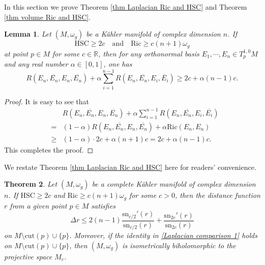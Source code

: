 \documentclass[12pt,reqno]{amsart}
\theoremstyle{plain}
\newtheorem{thm}{Theorem}[section]
\newtheorem{lemma}[thm]{Lemma}
\theoremstyle{definition}
\newcommand{\btheorem}{\begin{thm}}
\newcommand{\etheorem}{\end{thm}}
\newcommand{\bproof}{\begin{proof}}
\newcommand{\eproof}{\end{proof}}
\newcommand{\elemma}{\end{lemma}}
\newcommand{\blemma}{\begin{lemma}}
\renewcommand{\bar}{\overline}
\newcommand{\beq}{\begin{equation}}
\newcommand{\eeq}{\end{equation}}
\newcommand{\ee}{\end{eqnarray*}}
\newcommand{\be}{\begin{eqnarray*}}
\newcommand{\qtq}[1]{\quad\mbox{#1}\quad}
\renewcommand{\>}{\rightarrow}
\newcommand{\R}{{\mathbb R}}
\numberwithin{equation}{section} %
\newcommand{\om}{\omega}
\renewcommand{\leq}{\leqslant}
\renewcommand{\geq}{\geqslant}
\begin{document}
In this section we prove Theorem \ref{thm Laplacian Ric and HSC} and Theorem \ref{thm volume Ric and HSC}.

\blemma\label{keylinear2} Let $(M,\omega_g)$ be a K\"ahler manifold of complex dimension $n$.  If $$\mathrm{HSC}\geq 2c \qtq{and} \mathrm{Ric}\geq c(n+1)\om_g$$ at  point $p\in M$ for some $c\in \R$, then for any orthonormal basis $E_1,\cdots,E_{n}\in T^{1,0}_pM$ and any real number $\alpha\in [0,1]$, one has
\beq
R\left(E_n,\bar{E_n},E_n,\bar{E_n}\right)
+\alpha \sum_{i=1}^{n-1}R\left(E_n,\bar{E_n},E_i,\bar{E_i}\right)\geq 2c+\alpha(n-1)c. \label{mixed estimate2}\eeq
\elemma

\bproof  It is easy to see that
\be &&R\left(E_n,\bar{E_n},E_n,\bar{E_n}\right)
+\alpha \sum_{i=1}^{n-1}R\left(E_n,\bar{E_n},E_i,\bar{E_i}\right)\\&=&(1-\alpha)R\left(E_n,\bar{E_n},E_n,\bar{E_n}\right)+\alpha \mathrm{Ric}(E_n,E_n)\\&\geq&(1-\alpha)\cdot 2c+\alpha(n+1)c=2c+\alpha(n-1)c.  \ee
This completes the proof.
\eproof


\noindent We restate Theorem \ref{thm Laplacian Ric and HSC} here
for readers' convenience. \btheorem Let $(M, \omega_g)$ be a
complete K\"ahler manifold of complex dimension $n$. If
$\mathrm{HSC}\geq 2c$ and $\mathrm{Ric}\geq c(n+1)\om_g$ for some
$c>0$, then the distance function $r$ from a  given point $p\in M$
satisfies \beq \Delta r\leq
2(n-1)\frac{\mathrm{sn}_{c/2}'(r)}{\mathrm{sn}_{c/2}(r)}+\frac{\mathrm{sn}_{2c}'(r)}{\mathrm{sn}_{2c}(r)}\label{Laplacian
comparison 1} \eeq on $M\setminus\mathrm{cut}(p)\cup \{p\}$.
Moreover, if the identity in \eqref{Laplacian comparison 1} holds on
$M\setminus\mathrm{cut}(p)\cup \{p\}$, then $(M,\omega_g)$ is
isometrically biholomorphic to the projective space $M_c$. \etheorem
\end{document}
